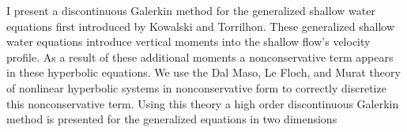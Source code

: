 
I present a discontinuous Galerkin method for the generalized shallow water equations
first introduced by Kowalski and Torrilhon.
These generalized shallow water equations introduce vertical moments into the shallow
flow's velocity profile.
As a result of these additional moments a nonconservative term appears in these
hyperbolic equations.
We use the Dal Maso, Le Floch, and Murat theory of nonlinear hyperbolic systems in
nonconservative form to correctly discretize this nonconservative term.
Using this theory a high order discontinuous Galerkin method is presented for the
generalized equations in two dimensions
